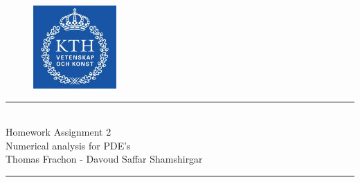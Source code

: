 \documentclass[10pt,a4paper,twoside, french]{article}
\numberwithin{equation}{section}
\numberwithin{figure}{section}
\numberwithin{table}{section}
\begin{document}
\begin{figure}[h]
\centering
\includegraphics[scale=.5]{fig/kth}
\vspace{-1.5cm}
\end{figure}
	\vspace{1cm}    
    \begin{center}
       		\rule{10cm}{1pt} \\[0.6cm]         %
        	{\huge Homework Assignment 2 \\[0.2cm]
         \Large  Numerical analysis for PDE's\\[0.2cm] 
          \large Thomas Frachon - Davoud Saffar Shamshirgar}  \\[0.6cm]
    		\rule{10cm}{1pt} \\[0.5cm]  
	\end{center}    
	
\end{document}
